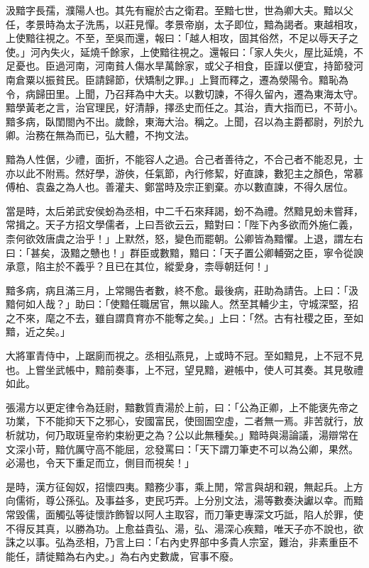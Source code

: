 
\begin{pinyinscope}
汲黯字長孺，濮陽人也。其先有寵於古之衛君。至黯七世，世為卿大夫。黯以父任，孝景時為太子洗馬，以莊見憚。孝景帝崩，太子即位，黯為謁者。東越相攻，上使黯往視之。不至，至吳而還，報曰：「越人相攻，固其俗然，不足以辱天子之使。」河內失火，延燒千餘家，上使黯往視之。還報曰：「家人失火，屋比延燒，不足憂也。臣過河南，河南貧人傷水旱萬餘家，或父子相食，臣謹以便宜，持節發河南倉粟以振貧民。臣請歸節，伏矯制之罪。」上賢而釋之，遷為滎陽令。黯恥為令，病歸田里。上聞，乃召拜為中大夫。以數切諫，不得久留內，遷為東海太守。黯學黃老之言，治官理民，好清靜，擇丞史而任之。其治，責大指而已，不苛小。黯多病，臥閨閤內不出。歲餘，東海大治。稱之。上聞，召以為主爵都尉，列於九卿。治務在無為而已，弘大體，不拘文法。

黯為人性倨，少禮，面折，不能容人之過。合己者善待之，不合己者不能忍見，士亦以此不附焉。然好學，游俠，任氣節，內行修絜，好直諫，數犯主之顏色，常慕傅柏、袁盎之為人也。善灌夫、鄭當時及宗正劉棄。亦以數直諫，不得久居位。

當是時，太后弟武安侯蚡為丞相，中二千石來拜謁，蚡不為禮。然黯見蚡未嘗拜，常揖之。天子方招文學儒者，上曰吾欲云云，黯對曰：「陛下內多欲而外施仁義，柰何欲效唐虞之治乎！」上默然，怒，變色而罷朝。公卿皆為黯懼。上退，謂左右曰：「甚矣，汲黯之戇也！」群臣或數黯，黯曰：「天子置公卿輔弼之臣，寧令從諛承意，陷主於不義乎？且已在其位，縱愛身，柰辱朝廷何！」

黯多病，病且滿三月，上常賜告者數，終不愈。最後病，莊助為請告。上曰：「汲黯何如人哉？」助曰：「使黯任職居官，無以踰人。然至其輔少主，守城深堅，招之不來，麾之不去，雖自謂賁育亦不能奪之矣。」上曰：「然。古有社稷之臣，至如黯，近之矣。」

大將軍青侍中，上踞廁而視之。丞相弘燕見，上或時不冠。至如黯見，上不冠不見也。上嘗坐武帳中，黯前奏事，上不冠，望見黯，避帳中，使人可其奏。其見敬禮如此。

張湯方以更定律令為廷尉，黯數質責湯於上前，曰：「公為正卿，上不能褒先帝之功業，下不能抑天下之邪心，安國富民，使囹圄空虛，二者無一焉。非苦就行，放析就功，何乃取斑皇帝約束紛更之為？公以此無種矣。」黯時與湯論議，湯辯常在文深小苛，黯伉厲守高不能屈，忿發罵曰：「天下謂刀筆吏不可以為公卿，果然。必湯也，令天下重足而立，側目而視矣！」

是時，漢方征匈奴，招懷四夷。黯務少事，乘上閒，常言與胡和親，無起兵。上方向儒術，尊公孫弘。及事益多，吏民巧弄。上分別文法，湯等數奏決讞以幸。而黯常毀儒，面觸弘等徒懷詐飾智以阿人主取容，而刀筆吏專深文巧詆，陷人於罪，使不得反其真，以勝為功。上愈益貴弘、湯，弘、湯深心疾黯，唯天子亦不說也，欲誅之以事。弘為丞相，乃言上曰：「右內史界部中多貴人宗室，難治，非素重臣不能任，請徙黯為右內史。」為右內史數歲，官事不廢。


\end{pinyinscope}
